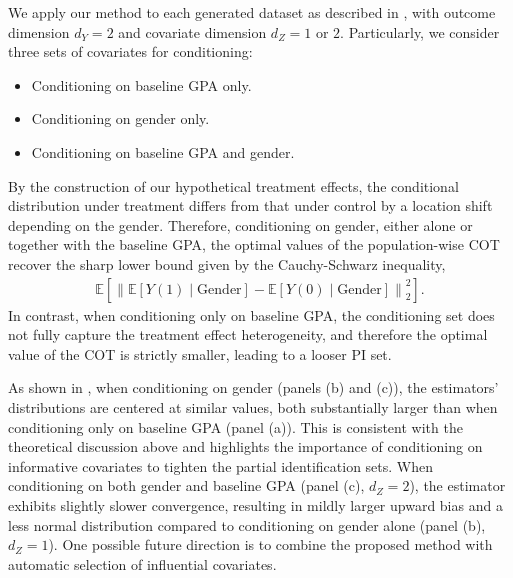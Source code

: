 \documentclass{article}
\theoremstyle{plain}
\theoremstyle{definition}
\theoremstyle{plain}
\begin{document}
We apply our method to each generated dataset as described in , with outcome dimension $d_Y = 2$ and covariate dimension $d_Z = 1$ or $2$.
Particularly, we consider three sets of covariates for conditioning:
\begin{itemize}
    \item [(a)] Conditioning on baseline GPA only.
    \item [(b)] Conditioning on gender only.
    \item [(c)] Conditioning on baseline GPA and gender.
\end{itemize}
By the construction of our hypothetical treatment effects, the conditional distribution under treatment differs from that under control by a location shift depending on the gender. 
Therefore, conditioning on gender, either alone or together with the baseline GPA, the optimal values of the population-wise COT recover the sharp lower bound given by the Cauchy-Schwarz inequality,
\begin{align*}
    \mathbb{E}\left[\left\|\mathbb{E}[Y(1)\mid \text{Gender}]-\mathbb{E}[Y(0)\mid \text{Gender}]\right\|_2^2\right].
\end{align*}
In contrast, when conditioning only on baseline GPA, the conditioning set does not fully capture the treatment effect heterogeneity, and therefore the optimal value of the COT is strictly smaller, leading to a looser PI set.


As shown in , when conditioning on gender (panels (b) and (c)), the estimators' distributions are centered at similar values, both substantially larger than when conditioning only on baseline GPA (panel (a)). This is consistent with the theoretical discussion above and highlights the importance of conditioning on informative covariates to tighten the partial identification sets. When conditioning on both gender and baseline GPA (panel (c), $d_Z=2$), the estimator exhibits slightly slower convergence, resulting in mildly larger upward bias and a less normal distribution compared to conditioning on gender alone (panel (b), $d_Z=1$). One possible future direction is to combine the proposed method with automatic selection of influential covariates.


\end{document}
